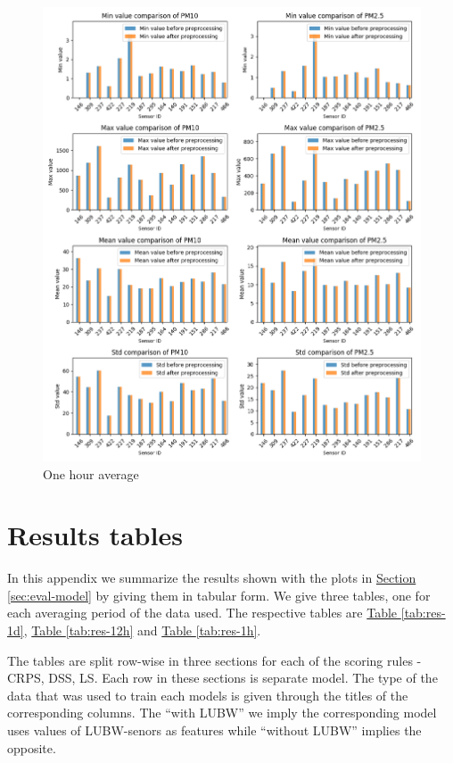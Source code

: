 \documentclass[12pt,a4paper,twoside]{scrartcl}
\numberwithin{equation}{section}
\newcommand{\refsec}[1]{\hyperref[#1]{Section \ref*{#1}}}
\newcommand{\reftab}[1]{\hyperref[#1]{Table \ref*{#1}}}
\newcounter{mypagecount}%
\newenvironment{interlude}{%
  \clearpage
  \setcounter{mypagecount}{\value{page}}%
  \thispagestyle{empty}%
  \pagestyle{empty}%
}{%
  \clearpage
  \setcounter{page}{\value{mypagecount}}%
}
\let\chapter=\section %
\begin{document}
\begin{interlude}
\begin{appendices}
\begin{center}
      \begin{figure}[H]
        \centerline{\includegraphics[width=1.1\textwidth,height=1.3\textwidth]{figures/data_files_changes/1H_sensor_metrics}}
        \caption[Metrics change during preprocessing (one hour average)]{One hour average}
      \end{figure}
      
    \end{center}
    \clearpage
    \chapter{Results tables}
    In this appendix we summarize the results shown with the plots in \refsec{sec:eval-model} by giving them in tabular form. We give three tables, one for each averaging period of the data used. The respective tables are \reftab{tab:res-1d}, \reftab{tab:res-12h} and \reftab{tab:res-1h}.

    The tables are split row-wise in three sections for each of the scoring rules - CRPS, DSS, LS. Each row in these sections is separate model. The type of the data that was used to train each models is given through the titles of the corresponding columns. The ``with LUBW'' we imply the corresponding model uses values of LUBW-senors as features while ``without LUBW'' implies the opposite.
    

\end{appendices}
\end{interlude}
\end{document}
